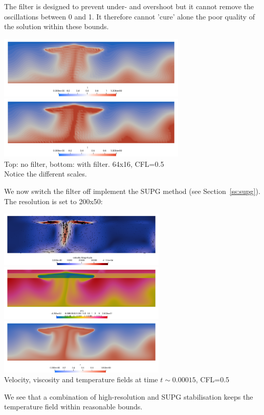 The filter is designed to prevent under- and overshoot but it cannot remove the oscillations between 0 and 1.
It therefore cannot 'cure' alone the poor quality of the solution within these bounds.
\begin{center}
\includegraphics[width=9cm]{python_codes/fieldstone_88/results/without}\\
\includegraphics[width=9cm]{python_codes/fieldstone_88/results/with}\\
{\captionfont Top: no filter, bottom: with filter. 64x16, CFL=0.5\\ Notice the different scales.}
\end{center}

We now switch the filter off implement the SUPG method (see Section~\ref{ss:supg}). 
The resolution is set to 200x50:
\begin{center}
\includegraphics[width=8cm]{python_codes/fieldstone_88/results/200x50/vel}\\
\includegraphics[width=8cm]{python_codes/fieldstone_88/results/200x50/eta}\\
\includegraphics[width=8cm]{python_codes/fieldstone_88/results/200x50/T}\\
{\captionfont Velocity, viscosity and temperature fields at time $t\sim 0.00015$, CFL=0.5} 
\end{center}
We see that a combination of high-resolution and SUPG stabilisation keeps the 
temperature field within reasonable bounds. 


